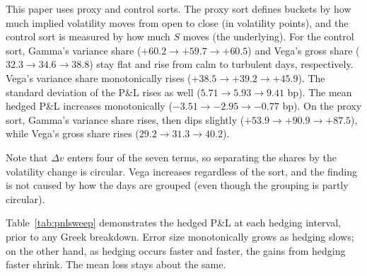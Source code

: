 \documentclass[11pt]{article}
\begin{document}
This paper uses proxy and control sorts. The proxy sort defines buckets by how much implied volatility moves from open to close (in volatility points), and the control sort is measured by how much $S$ moves (the underlying). For the control sort, Gamma's variance share ($+60.2 \to +59.7 \to +60.5$) and Vega's gross share ($32.3 \to 34.6 \to 38.8$) stay flat and rise from calm to turbulent days, respectively. Vega's variance share monotonically rises ($+38.5 \to +39.2 \to +45.9$). The standard deviation of the P\&L rises as well ($5.71 \to 5.93 \to 9.41$ bp). The mean hedged P\&L increases monotonically ($-3.51 \to -2.95 \to -0.77$ bp). On the proxy sort, Gamma's variance share rises, then dips slightly ($+53.9 \to +90.9 \to +87.5$), while Vega's gross share rises ($29.2 \to 31.3 \to 40.2$).

Note that $\Delta v$ enters four of the seven terms, so separating the shares by the volatility change is circular. Vega increases regardless of the sort, and the finding is not caused by how the days are grouped (even though the grouping is partly circular).

Table~\ref{tab:pnlsweep} demonstrates the hedged P\&L at each hedging interval, prior to any Greek breakdown. Error size monotonically grows as hedging slows; on the other hand, as hedging occurs faster and faster, the gains from hedging faster shrink. The mean loss stays about the same.


\end{document}
